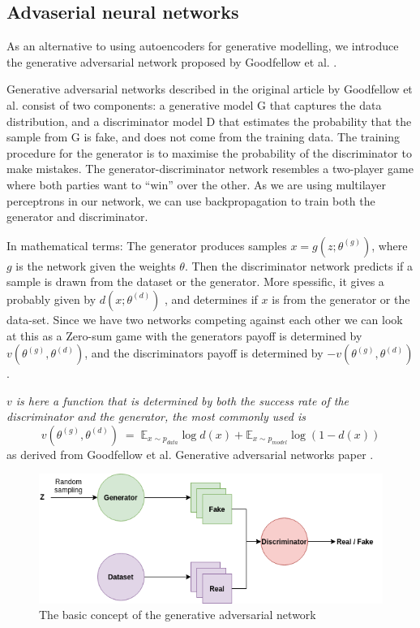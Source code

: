     
\subsection{Advaserial neural networks}
As an alternative to using autoencoders for generative modelling, we introduce the generative adversarial network proposed by Goodfellow et al. \cite{Goodfellow:2014:GAN:2969033.2969125}.

Generative adversarial networks described in the original article by Goodfellow et al. consist of two components: a generative model G that captures the data distribution, and a discriminator model D that estimates the probability that the sample from G is fake, and does not come from the training data. The training procedure for the generator is to maximise the probability of the discriminator to make mistakes.
The generator-discriminator network resembles a two-player game where both parties want to ``win'' over the other.
As we are using multilayer perceptrons in our network, we can use backpropagation to train both the generator and discriminator. 

In mathematical terms:
The generator produces samples $x=g(z;\theta^{(g)})$, where $g$ is the network given the weights $\theta$. Then the discriminator network predicts if a sample is drawn from the dataset or the generator.
More spessific, it gives a probably given by $d(x;\theta^{(d)})$ , and determines if $x$ is from the generator or the data-set. 
Since we have two networks competing against each other we can look at this as a Zero-sum game with the generators payoff is determined by $v(\theta^{(g)},\theta^{(d)})$, and the discriminators payoff is determined by $-v(\theta^{(g)},\theta^{(d)})$.

\textit{$v$ is here a function that is determined by both the success rate of the discriminator and the generator, the most commonly used is}
\begin{equation} 
    v(\theta^{(g)},\theta^{(d)}) \; = \; \mathds{E}_{x\sim p_{data}}\log{d(x)} + \mathds{E}_{x\sim p_{model}}\log{(1 - d(x))} 
\end{equation}
as derived from Goodfellow et al. Generative adversarial networks paper \cite{Goodfellow:2014:GAN:2969033.2969125}.


\begin{figure}[ht!]
    \centering
    \includegraphics[scale=0.6]{background/figures/GAN.png}
    \caption{The basic concept of the generative adversarial network}
    \label{fig:GAN}
\end{figure}
    
